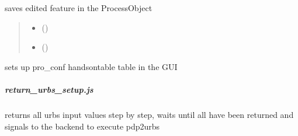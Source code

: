 \documentclass[letterpaper,10pt,english]{sphinxmanual}
\begin{document}
\begin{fulllineitems}
\label{\detokenize{docs_gui/js_api/urbs_editor/process_editor:writeBackProcessFeatures}}
\pysigstartsignatures
{}
\pysigstopsignatures
\sphinxAtStartPar
saves edited feature in the ProcessObject
\begin{quote}\begin{description}
\begin{itemize}
\item {} 
\sphinxAtStartPar
{} () \textendash{} 

\item {} 
\sphinxAtStartPar
{} () \textendash{} 

\end{itemize}

\end{description}\end{quote}

\end{fulllineitems}


\begin{fulllineitems}
\label{\detokenize{docs_gui/js_api/urbs_editor/process_editor:createPro_ConfEditor}}
\pysigstartsignatures
{}
\pysigstopsignatures
\sphinxAtStartPar
sets up pro\_conf handsontable table in the GUI

\end{fulllineitems}


\sphinxstepscope


\subparagraph{return\_urbs\_setup.js}
\label{\detokenize{docs_gui/js_api/urbs_editor/return_urbs_setup:return-urbs-setup-js}}\label{\detokenize{docs_gui/js_api/urbs_editor/return_urbs_setup::doc}}

\begin{fulllineitems}
\label{\detokenize{docs_gui/js_api/urbs_editor/return_urbs_setup:returnUrbsSetup}}
\pysigstartsignatures
{}
\pysigstopsignatures
\sphinxAtStartPar
returns all urbs input values step by step, waits until all have been returned and signals to the backend to execute pdp2urbs

\end{fulllineitems}
\end{document}

